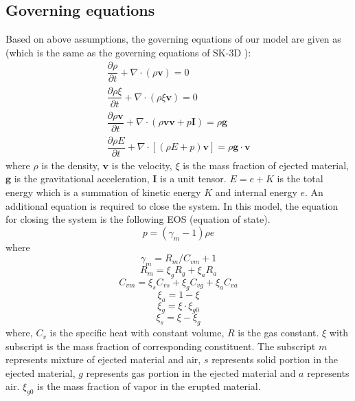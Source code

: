 \subsection{Governing equations}
Based on above assumptions, the governing equations of our model are given as (which is the same as the governing equations of SK-3D \citep{suzuki2005numerical}):
\begin{align}
\dfrac{\partial \rho}{\partial t} + \nabla \cdot \left(\rho \textbf{v}\right) = 0 \label{eq:gov-cs-rho} \\
\dfrac{\partial \rho \xi}{\partial t} + \nabla \cdot \left(\rho \xi \textbf{v}\right) = 0 \label{eq:gov-cs-ks}\\
\dfrac{\partial \rho \textbf{v}}{\partial t} + \nabla \cdot \left(\rho \textbf{v} \textbf{v} + p\textbf{I}\right) = \rho \textbf{g} \label{eq:gov-cs-v} \\
\dfrac{\partial \rho E}{\partial t} + \nabla \cdot \left[\left(\rho E + p \right)\textbf{v}\right] = \rho \textbf{g} \cdot\textbf{v} \label{eq:gov-cs-e}
\end{align}
where $\rho$ is the density, $\textbf{v}$ is the velocity, $\xi$ is the mass fraction of ejected material, $\textbf{g}$ is the gravitational acceleration, $\textbf{I}$ is a unit tensor.
$E = e + K $ is the total energy which is a summation of kinetic energy $K$ and internal energy $e$.
An additional equation is required to close the system. In this model, the equation for closing the system is the following EOS (equation of state).
\begin{equation}
p = \left(\gamma_m - 1\right)\rho e \label{eq:EOS}
\end{equation}
where 
\begin{equation}
\gamma_m = R_m/C_{vm} + 1 \label{eq:gov-gm}
\end{equation}
\begin{equation}
R_m = \xi_g R_g + \xi_a R_a  \label{eq:gov-Rm}
\end{equation}
\begin{equation}
C_{vm} = \xi_s C_{vs} + \xi_g C_{vg} + \xi_a C_{va} \label{eq:gov-Cvm}
\end{equation}
\begin{equation}
\xi_a = 1 - \xi \label{eq:gov-na}
\end{equation}
\begin{equation}
\xi_g = \xi \cdot \xi_{g0} \label{eq:gov-ng}
\end{equation}
\begin{equation}
\xi_s = \xi - \xi_g \label{eq:gov-ns}
\end{equation}
where, $C_v$ is the specific heat with constant volume, $R$ is the gas constant. $\xi$ with subscript is the mass fraction of corresponding constituent. The subscript 
$m$ represents mixture of ejected material and air, $s$ represents solid portion in the ejected material, $g$ represents gas portion in the ejected material and $a$ represents air. $\xi_{g0}$ is the mass fraction of vapor in the erupted material.

